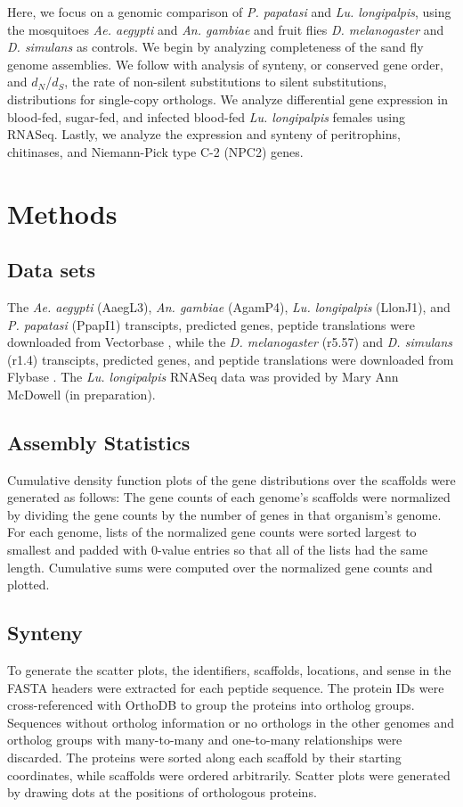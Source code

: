 Here, we focus on a genomic comparison of \emph{P. papatasi} and \emph{Lu. longipalpis}, using the mosquitoes \emph{Ae. aegypti} and \emph{An. gambiae} and fruit flies \emph{D. melanogaster} and \emph{D. simulans} as controls.  We begin by analyzing completeness of the sand fly genome assemblies.  We follow with analysis of synteny, or conserved gene order, and $d_N$/$d_S$, the rate of non-silent substitutions to silent substitutions, distributions for single-copy orthologs.  We analyze differential gene expression in blood-fed, sugar-fed, and infected blood-fed \emph{Lu. longipalpis} females using RNASeq.  Lastly, we analyze the expression and synteny of peritrophins, chitinases, and Niemann-Pick type C-2 (NPC2) genes.

\section{Methods}

\subsection{Data sets}
The \emph{Ae. aegypti} (AaegL3), \emph{An. gambiae} (AgamP4), \emph{Lu. longipalpis} (LlonJ1), and \emph{P. papatasi} (PpapI1) transcipts, predicted genes, peptide translations were downloaded from Vectorbase \cite{Lawson2007,Lawson2009}, while the \emph{D. melanogaster} (r5.57) and \emph{D. simulans} (r1.4) transcipts, predicted genes, and peptide translations were downloaded from Flybase \cite{Gelbart1997,Crosby2007,Tweedie2009}.  The \emph{Lu. longipalpis} RNASeq data was provided by Mary Ann McDowell (in preparation).

\subsection{Assembly Statistics}
Cumulative density function plots of the gene distributions over the scaffolds were generated as follows: The gene counts of each genome's scaffolds were normalized by dividing the gene counts by the number of genes in that organism's genome. For each genome, lists of the normalized gene counts were sorted largest to smallest and padded with 0-value entries so that all of the lists had the same length.  Cumulative sums were computed over the normalized gene counts and plotted.

\subsection{Synteny}
To generate the scatter plots, the identifiers, scaffolds, locations, and sense in the FASTA headers were extracted for each peptide sequence.  The protein IDs were cross-referenced with OrthoDB to group the proteins into ortholog groups.  Sequences without ortholog information or no orthologs in the other genomes and ortholog groups with many-to-many and one-to-many relationships were discarded.  The proteins were sorted along each scaffold by their starting coordinates, while scaffolds were ordered arbitrarily.  Scatter plots were generated by drawing dots at the positions of orthologous proteins.

